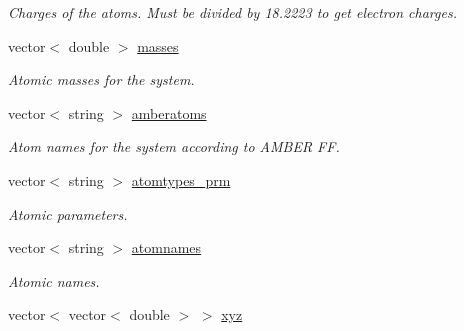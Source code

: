 \begin{DoxyCompactItemize}
\begin{DoxyCompactList}\small\item\em Charges of the atoms. Must be divided by 18.2223 to get electron charges. \item\end{DoxyCompactList}\item 
\hypertarget{classMol2_a74b5089ad2715395ee10b9fd88bff5cb}{
vector$<$ double $>$ \hyperlink{classMol2_a74b5089ad2715395ee10b9fd88bff5cb}{masses}}
\label{classMol2_a74b5089ad2715395ee10b9fd88bff5cb}

\begin{DoxyCompactList}\small\item\em Atomic masses for the system. \item\end{DoxyCompactList}\item 
\hypertarget{classMol2_af85e3cb0ab589edbe1f892600dd00d16}{
vector$<$ string $>$ \hyperlink{classMol2_af85e3cb0ab589edbe1f892600dd00d16}{amberatoms}}
\label{classMol2_af85e3cb0ab589edbe1f892600dd00d16}

\begin{DoxyCompactList}\small\item\em Atom names for the system according to AMBER FF. \item\end{DoxyCompactList}\item 
\hypertarget{classMol2_a6bda0cb634fcad4bc779b68e15e4862a}{
vector$<$ string $>$ \hyperlink{classMol2_a6bda0cb634fcad4bc779b68e15e4862a}{atomtypes\_\-prm}}
\label{classMol2_a6bda0cb634fcad4bc779b68e15e4862a}

\begin{DoxyCompactList}\small\item\em Atomic parameters. \item\end{DoxyCompactList}\item 
\hypertarget{classMol2_acfc5e49a5d727d7eb189d14af49dc686}{
vector$<$ string $>$ \hyperlink{classMol2_acfc5e49a5d727d7eb189d14af49dc686}{atomnames}}
\label{classMol2_acfc5e49a5d727d7eb189d14af49dc686}

\begin{DoxyCompactList}\small\item\em Atomic names. \item\end{DoxyCompactList}\item 
\hypertarget{classMol2_afb3479b3d5aea0293e981c2f94f20851}{
vector$<$ vector$<$ double $>$ $>$ \hyperlink{classMol2_afb3479b3d5aea0293e981c2f94f20851}{xyz}}
\label{classMol2_afb3479b3d5aea0293e981c2f94f20851}


\end{DoxyCompactItemize}
